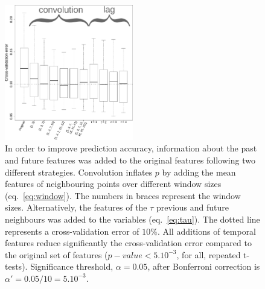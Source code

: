 \begin{figure}[h!]
  \centering    
    \includegraphics[width=0.5\textwidth]{figures/temporal_integration.pdf}
  \caption{
  In order to improve prediction accuracy, information about the past and future features was added to the original features following two different strategies.
  Convolution inflates $p$ by adding the mean features of neighbouring points over different window sizes (eq.~\ref{eq:window}).
  The numbers in braces represent the window sizes.
  Alternatively, the features of the $\tau$ previous and future neighbours was added to the variables (eq.~\ref{eq:tau}).
  The dotted line represents a cross-validation error of $10\%$.
  All additions of temporal features reduce significantly the cross-validation error compared to the original set of features ($p-value < 5.10^{-3}$, for all, repeated t-tests).
  Significance threshold, $\alpha = 0.05$, after Bonferroni correction is $\alpha' = 0.05/10 = 5.10^{-3}$.
  \label{fig:temporal_integration}
  }
\end{figure}

